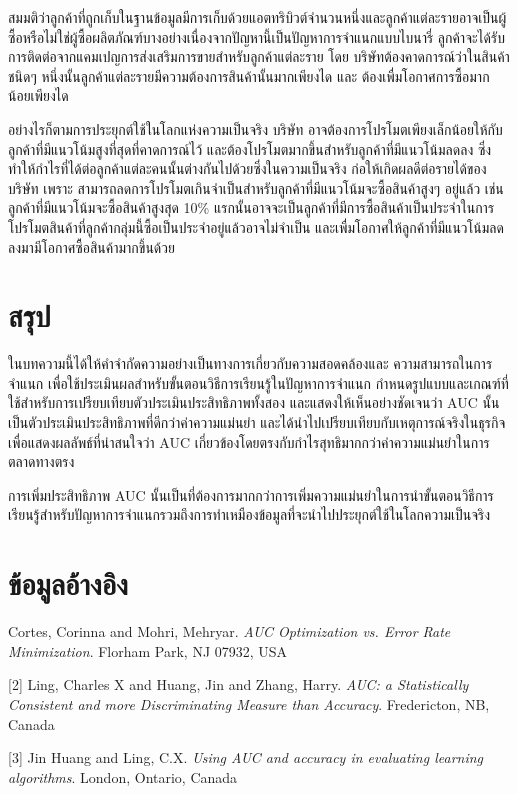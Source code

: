 \documentclass[twoside, twocolumn, 12pt]{article}
\begin{document}
สมมติว่าลูกค้าที่ถูกเก็บในฐานข้อมูลมีการเก็บด้วยแอตทริบิวต์จำนวนหนึ่งและลูกค้าแต่ละรายอาจเป็นผู้ซื้อหรือไม่ใช่ผู้ซื้อผลิตภัณฑ์บางอย่างเนื่องจากปัญหานี้เป็นปัญหาการจำแนกแบบไบนารี่ ลูกค้าจะได้รับการติดต่อจากแคมเปญการส่งเสริมการขายสำหรับลูกค้าแต่ละราย โดย บริษัทต้องคาดการณ์ว่าในสินค้าชนิดๆ หนึ่งนั้นลูกค้าแต่ละรายมีความต้องการสินค้านั้นมากเพียงได และ ต้องเพื่มโอกาศการซื้อมากน้อยเพียงได

อย่างไรก็ตามการประยุกต์ใช้ในโลกแห่งความเป็นจริง บริษัท อาจต้องการโปรโมตเพียงเล็กน้อยให้กับลูกค้าที่มีแนวโน้มสูงที่สุดที่คาดการณ์ไว้ และต้องโปรโมตมากขึ้นสำหรับลูกค้าที่มีแนวโน้มลดลง ซึ่งทำให้กำไรที่ได้ต่อลูกค้าแต่ละคนนั้นต่างกันไปด้วยซึ่งในความเป็นจริง ก่อให้เกิดผลดีต่อรายได้ของบริษัท เพราะ สามารถลดการโปรโมตเกินจำเป็นสำหรับลูกค้าที่มีแนวโน้มจะซื้อสินค้าสูงๆ อยู่แล้ว เช่นลูกค้าที่มีแนวโน้มจะซื้อสินค้าสูงสุด 10\% แรกนั้นอาจจะเป็นลูกค้าที่มีการซื้อสินค้าเป็นประจำในการโปรโมตสินค้าที่ลูกค้ากลุ่มนี้ซื้อเป็นประจำอยู่แล้วอาจไม่จำเป็น และเพื่มโอกาศให้ลูกค้าที่มีแนวโน้มลดลงมามีโอกาศซื้อสินค้ามากขึ้นด้วย 
\section{สรุป}
\quad ในบทความนี้ได้ให้คำจำกัดความอย่างเป็นทางการเกี่ยวกับความสอดคล้องและ ความสามารถในการจำแนก เพื่อใช้ประเมินผลสำหรับขั้นตอนวิธีการเรียนรู้ในปัญหาการจำแนก กำหนดรูปแบบและเกณฑ์ที่ใช้สำหรับการเปรียบเทียบตัวประเมินประสิทธิภาพทั้งสอง และแสดงให้เห็นอย่างชัดเจนว่า AUC นั้นเป็นตัวประเมินประสิทธิภาพที่ดีกว่าค่าความแม่นยำ และได้นำไปเปรียบเทียบกับเหตุการณ์จริงในธุรกิจเพื่อแสดงผลลัพธ์ที่น่าสนใจว่า AUC เกี่ยวข้องโดยตรงกับกำไรสุทธิมากกว่าค่าความแม่นยำในการตลาดทางตรง

การเพิ่มประสิทธิภาพ AUC นั้นเป็นที่ต้องการมากกว่าการเพิ่มความแม่นยำในการนำขั้นตอนวิธีการเรียนรู้สำหรับปัญหาการจำแนกรวมถึงการทำเหมืองข้อมูลที่จะนำไปประยุกต์ใช้ในโลกความเป็นจริง

\section*{ข้อมูลอ้างอิง}
\quad [1] Cortes, Corinna and Mohri, Mehryar. \textit{{AUC} {Optimization} vs. {Error} {Rate} {Minimization}}. Florham Park, NJ 07932, USA

[2] Ling, Charles X and Huang, Jin and Zhang, Harry. \textit{{AUC}: a {Statistically} {Consistent} and more {Discriminating} {Measure} than {Accuracy}}. Fredericton, NB, Canada

[3] {Jin Huang} and Ling, C.X. \textit{Using {AUC} and accuracy in evaluating learning algorithms}. London, Ontario, Canada
\end{document}
